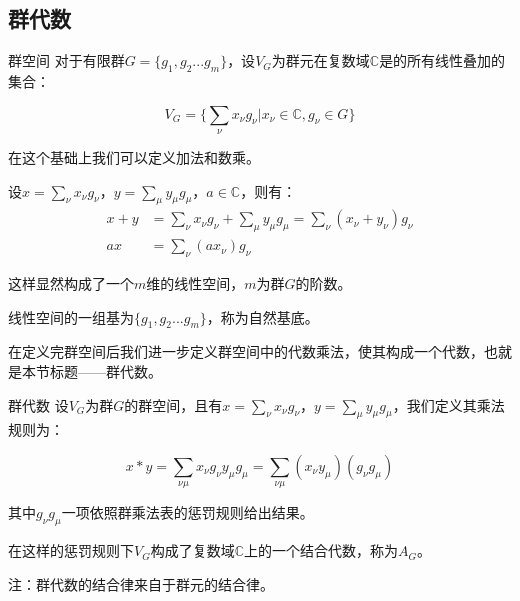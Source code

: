 


\subsection{群代数}
\begin{definition}{群空间}
对于有限群$G=\{g_1,g_2...g_m\}$，设$V_G$为群元在复数域$\mathbb{C}$是的所有线性叠加的集合：

\begin{equation}
V_G=\{\displaystyle\sum_\nu x_\nu g_\nu|x_\nu \in \mathbb{C},g_\nu \in G\}
\end{equation}

在这个基础上我们可以定义加法和数乘。

设$x=\displaystyle\sum_\nu x_\nu g_\nu$，$y=\displaystyle\sum_\mu y_\mu g_\mu$，$a\in \mathbb{C}$，则有：
\begin{align}
x+y&=\displaystyle\sum_\nu x_\nu g_\nu+\displaystyle\sum_\mu y_\mu g_\mu=\displaystyle\sum_\nu(x_\nu+y_\nu)g_\nu\\
ax&=\displaystyle\sum_\nu (ax_\nu) g_\nu
\end{align}

这样显然构成了一个$m$维的线性空间，$m$为群$G$的阶数。

线性空间的一组基为$\{g_1,g_2...g_m\}$，称为自然基底。

\end{definition}

在定义完群空间后我们进一步定义群空间中的代数乘法，使其构成一个代数，也就是本节标题——群代数。

\begin{definition}{群代数}
设$V_G$为群$G$的群空间，且有$x=\displaystyle\sum_\nu x_\nu g_\nu$，$y=\displaystyle\sum_\mu y_\mu g_\mu$，我们定义其乘法规则为：

\begin{equation}
x*y=\displaystyle\sum_{\nu\mu}x_\nu g_\nu y_\mu g_\mu=
\displaystyle\sum_{\nu\mu}(x_\nu y_\mu) (g_\nu g_\mu)
\end{equation}

其中$g_\nu g_\mu$一项依照群乘法表的惩罚规则给出结果。

在这样的惩罚规则下$V_G$构成了复数域$\mathbb{C}$上的一个结合代数，称为$A_G$。

\end{definition}

注：群代数的结合律来自于群元的结合律。

